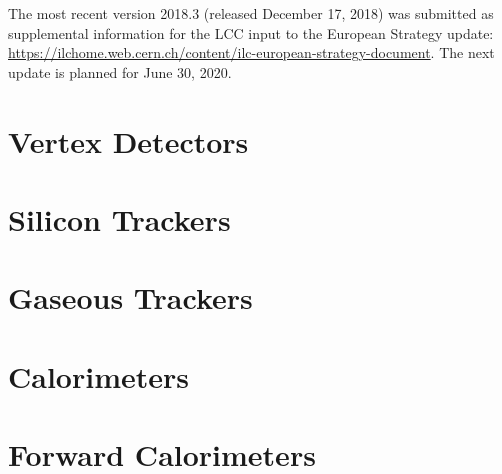 \documentclass[10pt,final]{report}
\begin{document}
The most recent version 2018.3 (released December 17, 2018) was submitted as supplemental information for the LCC input to the European Strategy update: \url{https://ilchome.web.cern.ch/content/ilc-european-strategy-document}. The next update is planned for June 30, 2020.


\chapter{Vertex Detectors}








\newpage

% 
\newpage
\chapter{Silicon Trackers}





\chapter{Gaseous Trackers}



\chapter{Calorimeters}













\chapter{Forward Calorimeters}



\end{document}
